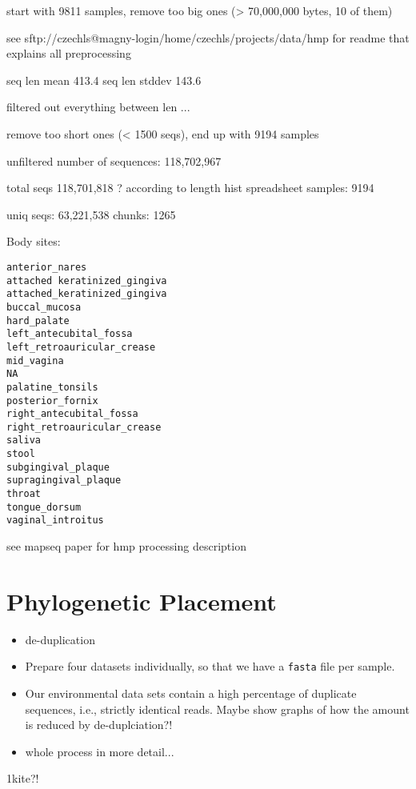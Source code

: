 start with 9811 samples, remove too big ones (> 70,000,000 bytes, 10 of them)

see sftp://czechls@magny-login/home/czechls/projects/data/hmp
for readme that explains all preprocessing

seq len mean 413.4
seq len stddev 143.6

filtered out everything between len ...

remove too short ones (< 1500 seqs), end up with 9194 samples

unfiltered number of sequences: 118,702,967

total seqs 118,701,818 ? according to length hist spreadsheet
samples: 9194

uniq seqs: 63,221,538
chunks: 1265

Body sites:

\begin{verbatim}
anterior_nares
attached keratinized_gingiva
attached_keratinized_gingiva
buccal_mucosa
hard_palate
left_antecubital_fossa
left_retroauricular_crease
mid_vagina
NA
palatine_tonsils
posterior_fornix
right_antecubital_fossa
right_retroauricular_crease
saliva
stool
subgingival_plaque
supragingival_plaque
throat
tongue_dorsum
vaginal_introitus
\end{verbatim}

see mapseq paper for hmp processing description



\section{Phylogenetic Placement}
\label{sec:PhylogeneticPlacement}

\begin{itemize}
    \item de-duplication
    \item Prepare four datasets individually, so that we have a \texttt{fasta} file per sample.
    \item Our environmental data sets contain a high percentage of duplicate sequences, i.e., strictly identical reads.
    Maybe show graphs of how the amount is reduced by de-duplciation?!
    \item whole process in more detail...
\end{itemize}


1kite?!

